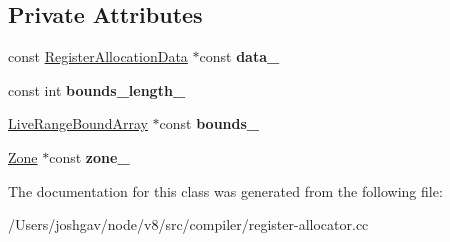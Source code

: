 \subsection*{Private Attributes}
\begin{DoxyCompactItemize}
\item 
const \hyperlink{classv8_1_1internal_1_1compiler_1_1_register_allocation_data}{Register\+Allocation\+Data} $\ast$const {\bfseries data\+\_\+}\hypertarget{classv8_1_1internal_1_1compiler_1_1_live_range_finder_a7791f0ffd15771d82a8a15bbd73262f5}{}\label{classv8_1_1internal_1_1compiler_1_1_live_range_finder_a7791f0ffd15771d82a8a15bbd73262f5}

\item 
const int {\bfseries bounds\+\_\+length\+\_\+}\hypertarget{classv8_1_1internal_1_1compiler_1_1_live_range_finder_ac77207725cc15ed0662b8fc31d25c64c}{}\label{classv8_1_1internal_1_1compiler_1_1_live_range_finder_ac77207725cc15ed0662b8fc31d25c64c}

\item 
\hyperlink{classv8_1_1internal_1_1compiler_1_1_live_range_bound_array}{Live\+Range\+Bound\+Array} $\ast$const {\bfseries bounds\+\_\+}\hypertarget{classv8_1_1internal_1_1compiler_1_1_live_range_finder_adc9f61ce5acdc54123a80ac4668c34bf}{}\label{classv8_1_1internal_1_1compiler_1_1_live_range_finder_adc9f61ce5acdc54123a80ac4668c34bf}

\item 
\hyperlink{classv8_1_1internal_1_1_zone}{Zone} $\ast$const {\bfseries zone\+\_\+}\hypertarget{classv8_1_1internal_1_1compiler_1_1_live_range_finder_a4b44fbcf8e022c63c8ce2e5c1a2c291b}{}\label{classv8_1_1internal_1_1compiler_1_1_live_range_finder_a4b44fbcf8e022c63c8ce2e5c1a2c291b}

\end{DoxyCompactItemize}


The documentation for this class was generated from the following file\+:\begin{DoxyCompactItemize}
\item 
/\+Users/joshgav/node/v8/src/compiler/register-\/allocator.\+cc\end{DoxyCompactItemize}
